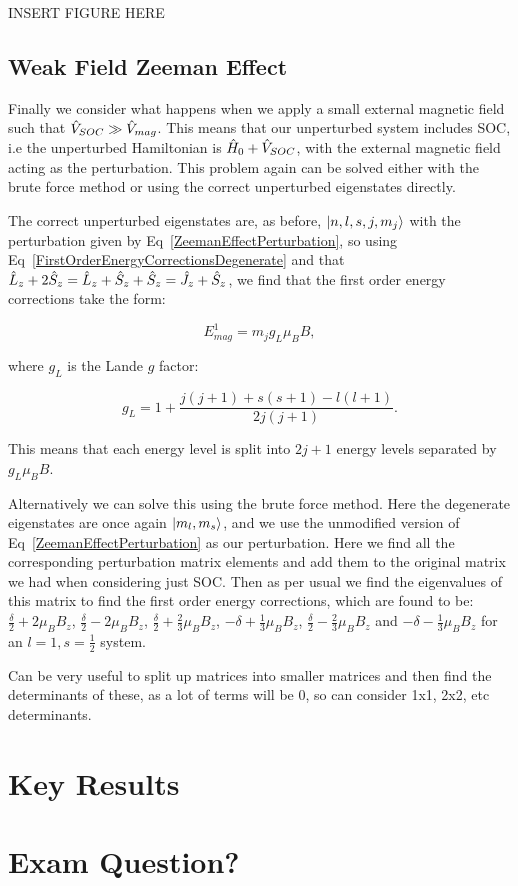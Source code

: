 INSERT FIGURE HERE

\subsection{Weak Field Zeeman Effect}

Finally we consider what happens when we apply a small external magnetic field such that $\Hat{V}_{SOC} \gg \Hat{V}_{mag}$. This means that our unperturbed system includes SOC, i.e the unperturbed Hamiltonian is $\Hat{H}_0 + \Hat{V}_{SOC}$, with the external magnetic field acting as the perturbation. This problem again can be solved either with the brute force method or using the correct unperturbed eigenstates directly.

\noindent The correct unperturbed eigenstates are, as before, $\ket{n, l, s, j, m_j}$ with the perturbation given by Eq~\ref{ZeemanEffectPerturbation}, so using Eq~\ref{FirstOrderEnergyCorrectionsDegenerate} and that $\Hat{L}_z + 2\Hat{S}_z = \Hat{L}_z + \Hat{S}_z + \Hat{S}_z = \Hat{J}_z + \Hat{S}_z$, we find that the first order energy corrections take the form:

\begin{equation}
    E^1_{mag} = m_j g_L \mu_B B,
    \label{WeakFieldEnergyCorrections}
\end{equation}

\noindent where $g_L$ is the Lande $g$ factor:

\begin{equation}
    g_L = 1 + \frac{j (j + 1) + s (s + 1) - l (l + 1)}{2j(j + 1)}
    \label{LandGFactor}.
\end{equation}

\noindent This means that each energy level is split into $2j + 1$ energy levels separated by $g_L \mu_B B$.

\noindent Alternatively we can solve this using the brute force method. Here the degenerate eigenstates are once again $\ket{m_l, m_s}$, and we use the unmodified version of Eq~\ref{ZeemanEffectPerturbation} as our perturbation. Here we find all the corresponding perturbation matrix elements and add them to the original matrix we had when considering just SOC. Then as per usual we find the eigenvalues of this matrix to find the first order energy corrections, which are found to be: $\frac{\delta}{2} + 2\mu_B B_z$, $\frac{\delta}{2} - 2\mu_B B_z$, $\frac{\delta}{2} + \frac{2}{3}\mu_B B_z$, $-\delta + \frac{1}{3}\mu_B B_z$, $\frac{\delta}{2} - \frac{2}{3}\mu_B B_z$ and $-\delta - \frac{1}{3}\mu_B B_z$ for an $l = 1, s = \frac{1}{2}$ system.


\noindent Can be very useful to split up matrices into smaller matrices and then find the determinants of these, as a lot of terms will be 0, so can consider 1x1, 2x2, etc determinants.

\section{Key Results}





\section{Exam Question?}


